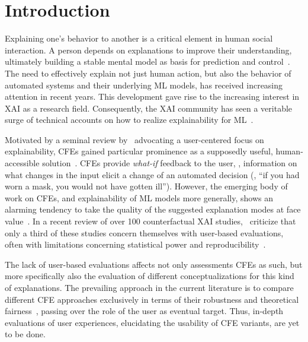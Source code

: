 \section{Introduction}\label{sec:introduction}

Explaining one's behavior to another is a critical element in human social interaction. 
A person depends on explanations to improve their understanding, ultimately building a stable mental model as basis for prediction and control~\citep{heider_psychology_1958}. 
The need to effectively explain not just human action, but also the behavior of automated systems and their underlying \gls{ML} models, has received increasing attention in recent years. This development gave rise to the increasing interest in \gls{XAI} as a research field. 
Consequently, the \gls{XAI} community has seen a veritable surge of technical accounts on how to realize explainability for \gls{ML}~\citep{guidotti_survey_2019}. 

Motivated by a seminal review by~\citep{miller_explanation_2019} advocating a user-centered focus on explainability, \glspl{CFE} gained particular prominence as a supposedly useful, human-accessible solution~\citep{keane_if_2021}.
\glspl{CFE} provide \textit{what-if} feedback to the user, \ie, information on what changes in the input elicit a change of an automated decision (\ie, ``if you had worn a mask, you would not have gotten ill''). %
However, the emerging body of work on \glspl{CFE}, and explainability of \gls{ML} models more generally, shows an alarming tendency to take the quality of the suggested explanation modes at face value~\citep{doshi-velez_towards_2017, offert_i_2017}.
In a recent review of over 100 counterfactual XAI studies,~\citeauthor{keane_if_2021} criticize that only a third of these studies concern themselves with user-based evaluations, often with limitations concerning statistical power and reproducibility~\citep{keane_if_2021}.

The lack of user-based evaluations affects not only assessments \glspl{CFE} as such, but more specifically also the evaluation of different conceptualizations for this kind of explanations.
The prevailing approach in the current literature is to compare different \gls{CFE} approaches exclusively in terms of their robustness and theoretical fairness~\citep{artelt_evaluating_2021, de_oliveira_framework_2021, white_measurable_2020}, passing over the role of the user as eventual target.  
Thus, in-depth evaluations of user experiences, elucidating the usability of \gls{CFE} variants, are yet to be done.

